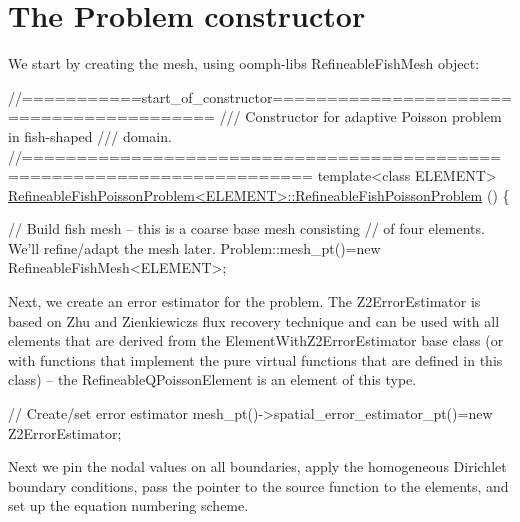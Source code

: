  

\hypertarget{index_constructor}{}\section{The Problem constructor}\label{index_constructor}
We start by creating the mesh, using {\ttfamily oomph-\/lib\textquotesingle{}s} {\ttfamily Refineable\+Fish\+Mesh} object\+:


\begin{DoxyCodeInclude}
\textcolor{comment}{//===========start\_of\_constructor=========================================}
\textcolor{comment}{/// Constructor for adaptive Poisson problem in fish-shaped}
\textcolor{comment}{}\textcolor{comment}{/// domain.}
\textcolor{comment}{}\textcolor{comment}{//========================================================================}
\textcolor{keyword}{template}<\textcolor{keyword}{class} ELEMENT>
\hyperlink{classRefineableFishPoissonProblem_a7a9c8258a867de6b3c8b9d00a7c965f1}{RefineableFishPoissonProblem<ELEMENT>::RefineableFishPoissonProblem}
      ()
\{ 
    
 \textcolor{comment}{// Build fish mesh -- this is a coarse base mesh consisting }
 \textcolor{comment}{// of four elements. We'll refine/adapt the mesh later.}
 Problem::mesh\_pt()=\textcolor{keyword}{new} RefineableFishMesh<ELEMENT>;

\end{DoxyCodeInclude}


Next, we create an error estimator for the problem. The {\ttfamily Z2\+Error\+Estimator} is based on Zhu and Zienkiewicz\textquotesingle{}s flux recovery technique and can be used with all elements that are derived from the {\ttfamily Element\+With\+Z2\+Error\+Estimator} base class (or with functions that implement the pure virtual functions that are defined in this class) -- the {\ttfamily Refineable\+Q\+Poisson\+Element} is an element of this type.


\begin{DoxyCodeInclude}
 \textcolor{comment}{// Create/set error estimator}
 mesh\_pt()->spatial\_error\_estimator\_pt()=\textcolor{keyword}{new} Z2ErrorEstimator;

\end{DoxyCodeInclude}


Next we pin the nodal values on all boundaries, apply the homogeneous Dirichlet boundary conditions, pass the pointer to the source function to the elements, and set up the equation numbering scheme.



